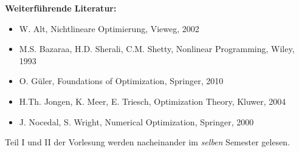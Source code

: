 \begin{course}
\begin{content}
\end{content}



\begin{literature}\textbf{Weiterführende Literatur:}

 \begin{itemize}\item W. Alt, Nichtlineare Optimierung, Vieweg, 2002  \item M.S. Bazaraa, H.D. Sherali, C.M. Shetty, Nonlinear Programming, Wiley, 1993  \item O. Güler, Foundations of Optimization, Springer, 2010  \item H.Th. Jongen, K. Meer, E. Triesch, Optimization Theory, Kluwer, 2004  \item J. Nocedal, S. Wright, Numerical Optimization, Springer, 2000  \end{itemize}\end{literature}

\begin{remarks}Teil I und II der Vorlesung werden nacheinander im \emph{selben }Semester gelesen.

\end{remarks}

\end{course}